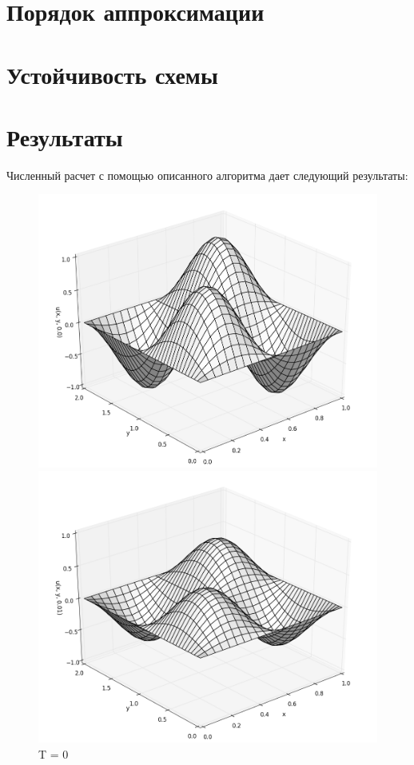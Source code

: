 \documentclass[12pt]{article}
\begin{document}
			
	\section{Порядок аппроксимации}
	
	\section{Устойчивость схемы}
	
	\section{Результаты}
		Численный расчет с помощью описанного алгоритма дает следующий результаты:
		
		\begin{figure}[h!]
			\begin{minipage}[h]{0.5\linewidth}
				\includegraphics[width=\linewidth]{solution_t00}
				\caption{T = 0}
			\end{minipage}
			\hfill
			\begin{minipage}[h]{0.5\linewidth}
				\includegraphics[width=\linewidth]{solution_t01}

\end{minipage}
\end{figure}
\end{document}
